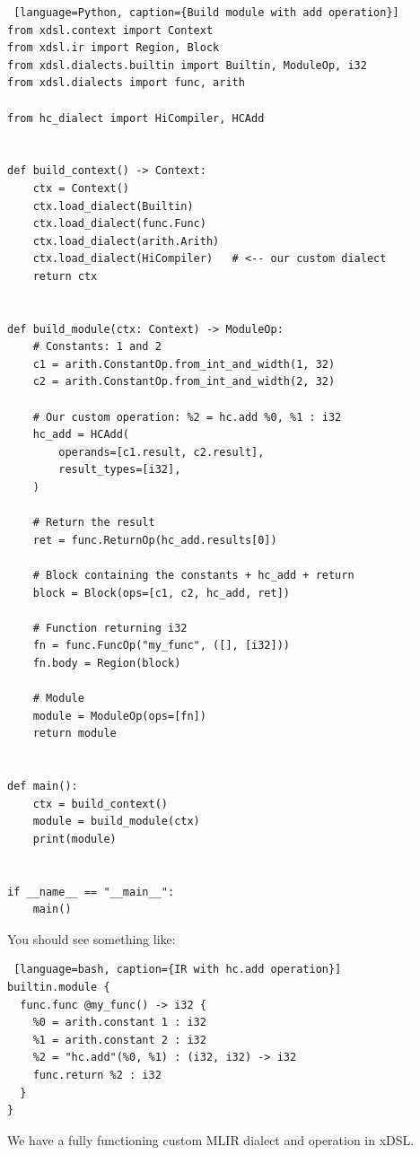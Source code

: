 \documentclass[../main.tex]{subfiles}
\begin{document}
\begin{lstlisting} [language=Python, caption={Build module with add operation}]
from xdsl.context import Context
from xdsl.ir import Region, Block
from xdsl.dialects.builtin import Builtin, ModuleOp, i32
from xdsl.dialects import func, arith

from hc_dialect import HiCompiler, HCAdd


def build_context() -> Context:
    ctx = Context()
    ctx.load_dialect(Builtin)
    ctx.load_dialect(func.Func)
    ctx.load_dialect(arith.Arith)
    ctx.load_dialect(HiCompiler)   # <-- our custom dialect
    return ctx


def build_module(ctx: Context) -> ModuleOp:
    # Constants: 1 and 2
    c1 = arith.ConstantOp.from_int_and_width(1, 32)
    c2 = arith.ConstantOp.from_int_and_width(2, 32)

    # Our custom operation: %2 = hc.add %0, %1 : i32
    hc_add = HCAdd(
        operands=[c1.result, c2.result],
        result_types=[i32],
    )

    # Return the result
    ret = func.ReturnOp(hc_add.results[0])

    # Block containing the constants + hc_add + return
    block = Block(ops=[c1, c2, hc_add, ret])

    # Function returning i32
    fn = func.FuncOp("my_func", ([], [i32]))
    fn.body = Region(block)

    # Module
    module = ModuleOp(ops=[fn])
    return module


def main():
    ctx = build_context()
    module = build_module(ctx)
    print(module)


if __name__ == "__main__":
    main()
\end{lstlisting}
You should see something like:
\begin{lstlisting} [language=bash, caption={IR with hc.add operation}]
builtin.module {
  func.func @my_func() -> i32 {
    %0 = arith.constant 1 : i32
    %1 = arith.constant 2 : i32
    %2 = "hc.add"(%0, %1) : (i32, i32) -> i32
    func.return %2 : i32
  }
}
\end{lstlisting}
We have a fully functioning custom MLIR dialect and operation in xDSL.
\end{document}
